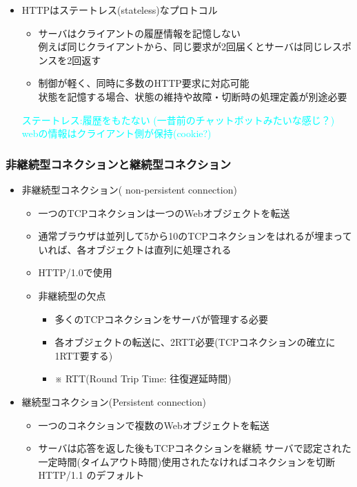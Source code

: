 \begin{itemize}
  \item HTTPはステートレス(stateless)なプロトコル
  \begin{itemize}
    \item サーバはクライアントの履歴情報を記憶しない\\
      例えば同じクライアントから、同じ要求が2回届くとサーバは同じレスポンスを2回返す
    \item 制御が軽く、同時に多数のHTTP要求に対応可能\\
      状態を記憶する場合、状態の維持や故障・切断時の処理定義が別途必要
  \end{itemize}
  \textcolor{cyan}{ステートレス:履歴をもたない (一昔前のチャットボットみたいな感じ？)}\\
  \textcolor{cyan}{webの情報はクライアント側が保持(cookie?)}
\end{itemize}

\subsubsection{非継続型コネクションと継続型コネクション}

\begin{itemize}
  \item 非継続型コネクション( non-persistent connection)
  \begin{itemize}
    \item 一つのTCPコネクションは一つのWebオブジェクトを転送
    \item 通常ブラウザは並列して5から10のTCPコネクションをはれるが埋まっていれば、各オブジェクトは直列に処理される
    \item HTTP/1.0で使用
  \end{itemize}

  \begin{itemize}
    \item 非継続型の欠点
    \begin{itemize}
      \item 多くのTCPコネクションをサーバが管理する必要
      \item 各オブジェクトの転送に、2RTT必要(TCPコネクションの確立に1RTT要する)
      \item[] ※ RTT(Round Trip Time: 往復遅延時間)\label{rtt_ref}
    \end{itemize}
  \end{itemize}
\end{itemize}

\begin{itemize}
  \item 継続型コネクション(Persistent connection)
  \begin{itemize}
    \item 一つのコネクションで複数のWebオブジェクトを転送
    \item サーバは応答を返した後もTCPコネクションを継続
    サーバで認定された一定時間(タイムアウト時間)使用されたなければコネクションを切断
    HTTP/1.1 のデフォルト
  \end{itemize}
\end{itemize}

